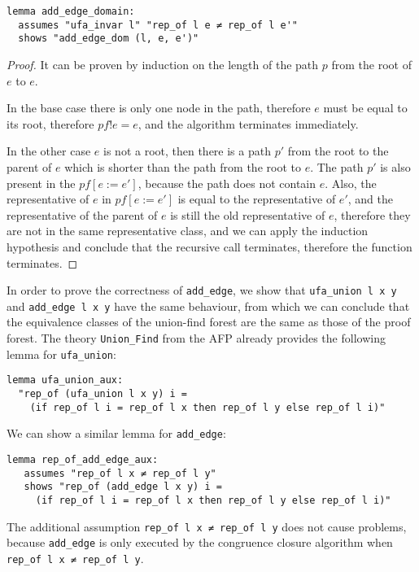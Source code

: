 \begin{lstlisting}
lemma add_edge_domain:
  assumes "ufa_invar l" "rep_of l e ≠ rep_of l e'"
  shows "add_edge_dom (l, e, e')"
\end{lstlisting}

\begin{proof}
It can be proven by induction on the length of the path $p$ from the root of $e$ to $e$.

In the base case there is only one node in the path, therefore $e$ must be equal to its root, therefore $pf ! e = e$, and the algorithm terminates immediately.

In the other case $e$ is not a root, then there is a path $p'$ from the root to the parent of $e$ which is shorter than the path from the root to $e$. The path $p'$ is also present in the $pf[e := e']$, because the path does not contain $e$. Also, the representative of $e$ in $pf[e := e']$ is equal to the representative of $e'$, and the representative of the parent of $e$ is still the old representative of $e$, therefore they are not in the same representative class, and we can apply the induction hypothesis and conclude that the recursive call terminates, therefore the function terminates.
\end{proof}

In order to prove the correctness of \lstinline|add_edge|, we show that \lstinline{ufa_union l x y} and \lstinline{add_edge l x y} have the same behaviour, from which we can conclude that the equivalence classes of the union-find forest are the same as those of the proof forest. The theory \lstinline{Union_Find} from the AFP \cite{Sep} already provides the following lemma for \lstinline{ufa_union}:

\begin{lstlisting}
lemma ufa_union_aux:
  "rep_of (ufa_union l x y) i =
    (if rep_of l i = rep_of l x then rep_of l y else rep_of l i)"
\end{lstlisting}

We can show a similar lemma for \lstinline{add_edge}:

\begin{lstlisting}
lemma rep_of_add_edge_aux:
   assumes "rep_of l x ≠ rep_of l y"
   shows "rep_of (add_edge l x y) i =
     (if rep_of l i = rep_of l x then rep_of l y else rep_of l i)"
\end{lstlisting}

The additional assumption \lstinline{rep_of l x ≠ rep_of l y} does not cause problems, because \lstinline{add_edge} is only executed by the congruence closure algorithm when \lstinline{rep_of l x ≠ rep_of l y}.

